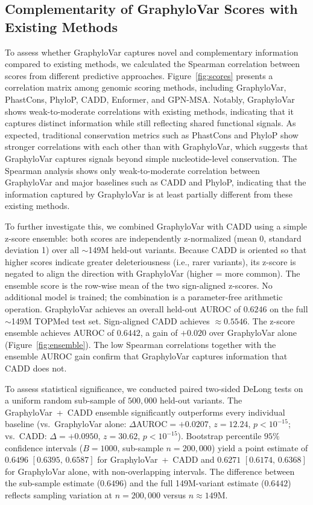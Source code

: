 \documentclass[unnumsec,webpdf,contemporary,large]{oup-authoring-template}%
\newcommand{\rev}[1]{{\color{red}#1}}
\theoremstyle{thmstyleone}%
\theoremstyle{thmstyletwo}%
\theoremstyle{thmstylethree}%
\begin{document}
\subsection{Complementarity of GraphyloVar Scores with Existing Methods}

To assess whether GraphyloVar captures novel and complementary information compared to existing methods, we calculated the Spearman correlation between scores from different predictive approaches. Figure~\ref{fig:scores} presents a correlation matrix among genomic scoring methods, including GraphyloVar, PhastCons, PhyloP, CADD, Enformer, and GPN-MSA. Notably, GraphyloVar shows weak-to-moderate correlations with existing methods, indicating that it captures distinct information while still reflecting shared functional signals.
\rev{As expected, traditional conservation metrics such as PhastCons and PhyloP show stronger correlations with each other than with GraphyloVar, which suggests that GraphyloVar captures signals beyond simple nucleotide-level conservation. The Spearman analysis shows only weak-to-moderate correlation between GraphyloVar and major baselines such as CADD and PhyloP, indicating that the information captured by GraphyloVar is at least partially different from these existing methods.}

\rev{To further investigate this, we combined GraphyloVar with CADD using a simple z-score ensemble: both scores are independently z-normalized (mean 0, standard deviation 1) over all $\sim$149M held-out variants. Because CADD is oriented so that higher scores indicate greater deleteriousness (i.e., rarer variants), its z-score is negated to align the direction with GraphyloVar (higher = more common). The ensemble score is the row-wise mean of the two sign-aligned z-scores. No additional model is trained; the combination is a parameter-free arithmetic operation. GraphyloVar achieves an overall held-out AUROC of $0.6246$ on the full $\sim$149M TOPMed test set. Sign-aligned CADD achieves $\approx 0.5546$. The z-score ensemble achieves AUROC of $0.6442$, a gain of $+0.020$ over GraphyloVar alone (Figure~\ref{fig:ensemble}). The low Spearman correlations together with the ensemble AUROC gain confirm that GraphyloVar captures information that CADD does not.}

\rev{To assess statistical significance, we conducted paired two-sided DeLong tests on a uniform random sub-sample of $500{,}000$ held-out variants. The GraphyloVar~+~CADD ensemble significantly outperforms every individual baseline (vs.\ GraphyloVar alone: $\Delta$AUROC$=+0.0207$, $z=12.24$, $p<10^{-15}$; vs.\ CADD: $\Delta=+0.0950$, $z=30.62$, $p<10^{-15}$). Bootstrap percentile $95\%$ confidence intervals ($B=1000$, sub-sample $n=200{,}000$) yield a point estimate of $0.6496$ $[0.6395,\,0.6587]$ for GraphyloVar~+~CADD and $0.6271$ $[0.6174,\,0.6368]$ for GraphyloVar alone, with non-overlapping intervals. The difference between the sub-sample estimate ($0.6496$) and the full 149M-variant estimate ($0.6442$) reflects sampling variation at $n=200{,}000$ versus $n{\approx}149\text{M}$.}
\end{document}
